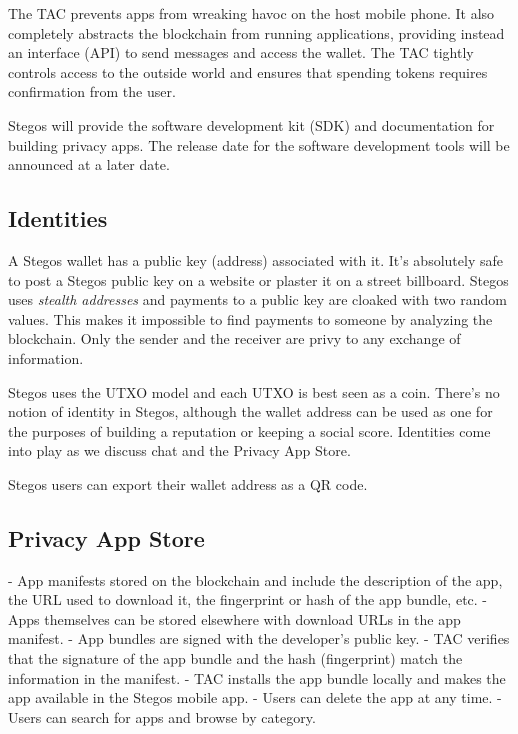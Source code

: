\documentclass[8pt,fleqn,openany]{book}
\begin{document}
The TAC prevents apps from wreaking havoc on the host mobile phone. It also completely abstracts the blockchain from running applications, providing instead an interface (API) to send messages and access the wallet. The TAC tightly controls access to the outside world and ensures that spending tokens requires confirmation from the user. 

Stegos will provide the software development kit (SDK) and documentation for building privacy apps. The release date for the software development tools will be announced at a later date.

\subsection{Identities}\label{Identities}
A Stegos wallet has a public key (address) associated with it. It's absolutely safe to post a Stegos public key on a website or plaster it on a street billboard. Stegos uses \textit{stealth addresses} and payments to a public key are cloaked with two random values. This makes it impossible to find payments to someone by analyzing the blockchain. Only the sender and the receiver are privy to any exchange of information. 

Stegos uses the UTXO model and each UTXO is best seen as a coin. There's no notion of identity in Stegos, although the wallet address can be used as one for the purposes of building a reputation or keeping a social score. Identities come into play as we discuss chat and the Privacy App Store. 
 
Stegos users can export their wallet address as a QR code. 
 
\subsection{Privacy App Store}
 
- App manifests stored on the blockchain and include the description of the app, the URL used to download it, the fingerprint or hash of the app bundle, etc. 
- Apps themselves can be stored elsewhere with download URLs in the app manifest.
- App bundles are signed with the developer's public key.
- TAC verifies that the signature of the app bundle and the hash (fingerprint) match the information in the manifest.
- TAC installs the app bundle locally and makes the app available in the Stegos mobile app.
- Users can delete the app at any time.
- Users can search for apps and browse by category. 
\end{document}
